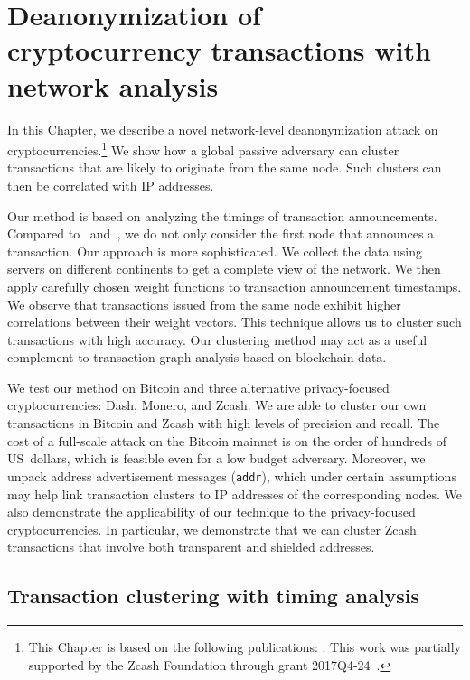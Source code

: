 \chapter{Deanonymization of cryptocurrency transactions with network analysis} %

\label{Chapter03Clustering}

In this Chapter, we describe a novel network-level deanonymization attack on cryptocurrencies.\footnote{This Chapter is based on the following publications: \cite{Biryukov2019a, Biryukov2019b}. This work was partially supported by the Zcash Foundation through grant 2017Q4-24~\cite{Feher2017}.}
We show how a global passive adversary can cluster transactions that are likely to originate from the same node.
Such clusters can then be correlated with IP addresses.

Our method is based on analyzing the timings of transaction announcements.
Compared to~\cite{Biryukov2014} and~\cite{Koshy2014}, we do not only consider the first node that announces a transaction.
Our approach is more sophisticated.
We collect the data using servers on different continents to get a complete view of the network.
We then apply carefully chosen weight functions to transaction announcement timestamps.
We observe that transactions issued from the same node exhibit higher correlations between their weight vectors.
This technique allows us to cluster such transactions with high accuracy.
Our clustering method may act as a useful complement to transaction graph analysis based on blockchain data.

We test our method on Bitcoin and three alternative privacy-focused cryptocurrencies: Dash, Monero, and Zcash.
We are able to cluster our own transactions in Bitcoin and Zcash with high levels of precision and recall.
The cost of a full-scale attack on the Bitcoin mainnet is on the order of hundreds of US~dollars, which is feasible even for a low budget adversary.
Moreover, we unpack address advertisement messages (\texttt{addr}), which under certain assumptions may help link transaction clusters to IP addresses of the corresponding nodes.
We also demonstrate the applicability of our technique to the privacy-focused cryptocurrencies.
In particular, we demonstrate that we can cluster Zcash transactions that involve both transparent and shielded addresses.


\section{Transaction clustering with timing analysis}  \label{sec:Ch03Ourapproach}

